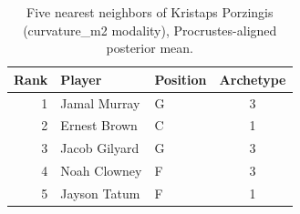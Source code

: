\begin{table}[htbp]
  \centering\small
  \begin{tabular}{rllc}
    \toprule
    Rank & Player & Position & Archetype \\
    \midrule
    1 & Jamal Murray & G & 3 \\
    2 & Ernest Brown & C & 1 \\
    3 & Jacob Gilyard & G & 3 \\
    4 & Noah Clowney & F & 3 \\
    5 & Jayson Tatum & F & 1 \\
    \bottomrule
  \end{tabular}
  \caption{Five nearest neighbors of Kristaps Porzingis (curvature_m2 modality), Procrustes-aligned posterior mean.}
  \label{tab:Kristaps_Porzingis_neighbors_curvature_m2}
\end{table}

